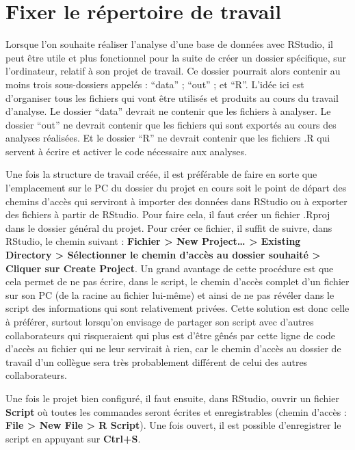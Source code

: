 \documentclass[
  letterpaper,
]{book}
\begin{document}
\section{Fixer le répertoire de
travail}\label{fixer-le-ruxe9pertoire-de-travail}

Lorsque l'on souhaite réaliser l'analyse d'une base de données avec
RStudio, il peut être utile et plus fonctionnel pour la suite de créer
un dossier spécifique, sur l'ordinateur, relatif à son projet de
travail. Ce dossier pourrait alors contenir au moins trois sous-dossiers
appelés : ``data'' ; ``out'' ; et ``R''. L'idée ici est d'organiser tous
les fichiers qui vont être utilisés et produits au cours du travail
d'analyse. Le dossier ``data'' devrait ne contenir que les fichiers à
analyser. Le dossier ``out'' ne devrait contenir que les fichiers qui
sont exportés au cours des analyses réalisées. Et le dossier ``R'' ne
devrait contenir que les fichiers .R qui servent à écrire et activer le
code nécessaire aux analyses.

Une fois la structure de travail créée, il est préférable de faire en
sorte que l'emplacement sur le PC du dossier du projet en cours soit le
point de départ des chemins d'accès qui serviront à importer des données
dans RStudio ou à exporter des fichiers à partir de RStudio. Pour faire
cela, il faut créer un fichier .Rproj dans le dossier général du projet.
Pour créer ce fichier, il suffit de suivre, dans RStudio, le chemin
suivant : \textbf{Fichier \textgreater{} New Project\ldots{}
\textgreater{} Existing Directory \textgreater{} Sélectionner le chemin
d'accès au dossier souhaité \textgreater{} Cliquer sur Create Project}.
Un grand avantage de cette procédure est que cela permet de ne pas
écrire, dans le script, le chemin d'accès complet d'un fichier sur son
PC (de la racine au fichier lui-même) et ainsi de ne pas révéler dans le
script des informations qui sont relativement privées. Cette solution
est donc celle à préférer, surtout lorsqu'on envisage de partager son
script avec d'autres collaborateurs qui risqueraient qui plus est d'être
gênés par cette ligne de code d'accès au fichier qui ne leur servirait à
rien, car le chemin d'accès au dossier de travail d'un collègue sera
très probablement différent de celui des autres collaborateurs.

Une fois le projet bien configuré, il faut ensuite, dans RStudio, ouvrir
un fichier \textbf{Script} où toutes les commandes seront écrites et
enregistrables (chemin d'accès : \textbf{File \textgreater{} New File
\textgreater{} R Script}). Une fois ouvert, il est possible
d'enregistrer le script en appuyant sur \textbf{Ctrl+S}.
\end{document}
